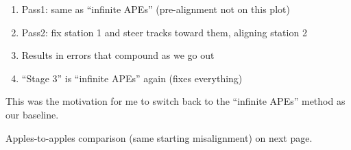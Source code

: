 \documentclass[compress]{beamer}
\begin{document}
\begin{frame}
\vfill
\begin{enumerate}
\item Pass1: same as ``infinite APEs'' (pre-alignment not on this plot)
\item Pass2: fix station 1 and steer tracks toward them, aligning station 2
\item Results in errors that compound as we go out
\item ``Stage 3'' is ``infinite APEs'' again (fixes everything)
\end{enumerate}

\vfill
This was the motivation for me to switch back to the ``infinite APEs'' method as our baseline.

\vfill
Apples-to-apples comparison (same starting misalignment) on next page.
\end{frame}
\end{document}
